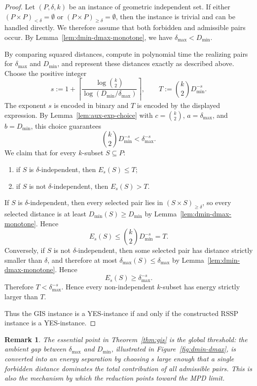 \documentclass[11pt]{article}
\newtheorem{remark}{Remark}
\newcommand{\bin}[1]{\binom{#1}{2}}
\begin{document}
\begin{proof}
Let $(P,\delta,k)$ be an instance of geometric independent set. If either
$(P\times P)_{<\delta}=\emptyset$ or $(P\times P)_{\ge\delta}=\emptyset$, then
the instance is trivial and can be handled directly. We therefore assume that
both forbidden and admissible pairs occur. By
Lemma~\ref{lem:dmin-dmax-monotone}, we have $\delta_{\max}<D_{\min}$.

By comparing squared distances, compute in polynomial time the realizing pairs for $\delta_{\max}$ and $D_{\min}$, and represent these distances exactly as described above. Choose the positive integer
\[
s:=1+\left\lceil\frac{\log \bin{k}}{\log(D_{\min}/\delta_{\max})}\right\rceil,
\qquad
T:=\bin{k}D_{\min}^{-s}.
\]
The exponent $s$ is encoded in binary and $T$ is encoded by the displayed expression. By Lemma~\ref{lem:aux-exp-choice} with $c=\bin{k}$, $a=\delta_{\max}$, and $b=D_{\min}$, this choice guarantees
\[
\bin{k}D_{\min}^{-s}<\delta_{\max}^{-s}.
\]
We claim that for every $k$-subset $S\subseteq P$:
\begin{enumerate}
\item if $S$ is $\delta$-independent, then $E_s(S)\le T$;
\item if $S$ is not $\delta$-independent, then $E_s(S)>T$.
\end{enumerate}

If $S$ is $\delta$-independent, then every selected pair lies in
$(S\times S)_{\ge\delta}$, so every selected distance is at least
$D_{\min}(S)\ge D_{\min}$ by Lemma~\ref{lem:dmin-dmax-monotone}. Hence
\[
E_s(S)\le \bin{k}D_{\min}^{-s}=T.
\]
Conversely, if $S$ is not $\delta$-independent, then some selected pair has
distance strictly smaller than $\delta$, and therefore at most
$\delta_{\max}(S)\le \delta_{\max}$ by
Lemma~\ref{lem:dmin-dmax-monotone}. Hence
\[
E_s(S)\ge \delta_{\max}^{-s}.
\]
Therefore $T<\delta_{\max}^{-s}$. Hence every non-independent $k$-subset has
energy strictly larger than $T$.

Thus the GIS instance is a YES-instance if and only if the constructed RSSP
instance is a YES-instance.
\end{proof}

\begin{remark}
The essential point in Theorem~\ref{thm:gis} is the global threshold: the
ambient gap between $\delta_{\max}$ and $D_{\min}$, illustrated in
Figure~\ref{fig:dmin-dmax}, is converted into an energy separation by choosing
$s$ large enough that a single forbidden distance dominates the total
contribution of all admissible pairs. This is also the mechanism by which the
reduction points toward the MPD limit.
\end{remark}
\end{document}

